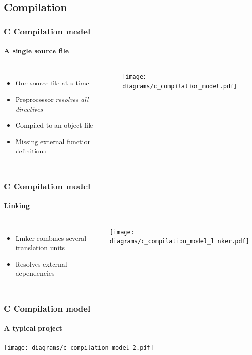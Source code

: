 \documentclass[table]{beamer}
\newcommand{\declarelesson}{\textbf{\color{themegreen}{Lesson:}} }
\begin{document}


\subsection{Compilation}
\frame{\subsectionpage}

\begin{frame}
    \frametitle{\declarelesson C Compilation model}
    \framesubtitle{A single source file}
    \begin{columns}[t]
        \column{4cm}
        \begin{itemize}
            \item One source file at a time
            \item Preprocessor \emph{resolves all directives}
            \item Compiled to an object file
            \item Missing external function definitions
        \end{itemize}
        \column[T]{8cm}
        \texttt{[image: diagrams/c\_compilation\_model.pdf]}
    \end{columns}
\end{frame}

\begin{frame}
    \frametitle{\declarelesson C Compilation model}
    \framesubtitle{Linking}
    \begin{columns}[t]
        \column{4cm}
        \begin{itemize}
            \item Linker combines several translation units
            \item Resolves external dependencies
        \end{itemize}
        \column[T]{8cm}
        \texttt{[image: diagrams/c\_compilation\_model\_linker.pdf]}
    \end{columns}
\end{frame}

\begin{frame}
    \frametitle{\declarelesson C Compilation model}
    \framesubtitle{A typical project}
    \texttt{[image: diagrams/c\_compilation\_model\_2.pdf]}
\end{frame}
\end{document}
